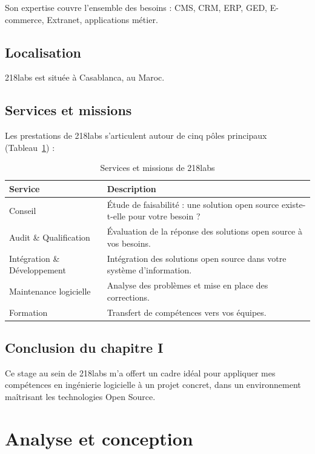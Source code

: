 \documentclass[12pt,a4paper]{report}
\begin{document}
Son expertise couvre l'ensemble des besoins : CMS, CRM, ERP, GED, E-commerce, Extranet, applications métier.

\section{Localisation}

218labs est située à Casablanca, au Maroc.

\section{Services et missions}

Les prestations de 218labs s'articulent autour de cinq pôles principaux (Tableau~\ref{tab:services}) :

\begin{table}[h]
\centering
\begin{tabular}{|l|p{8cm}|}
\hline
\textbf{Service} & \textbf{Description} \\
\hline
Conseil & Étude de faisabilité : une solution open source existe-t-elle pour votre besoin ? \\
\hline
Audit \& Qualification & Évaluation de la réponse des solutions open source à vos besoins. \\
\hline
Intégration \& Développement & Intégration des solutions open source dans votre système d'information. \\
\hline
Maintenance logicielle & Analyse des problèmes et mise en place des corrections. \\
\hline
Formation & Transfert de compétences vers vos équipes. \\
\hline
\end{tabular}
\caption{Services et missions de 218labs}
\label{tab:services}
\end{table}

\section*{Conclusion du chapitre I}

Ce stage au sein de 218labs m'a offert un cadre idéal pour appliquer mes compétences en ingénierie logicielle à un projet concret, dans un environnement maîtrisant les technologies Open Source.

\chapter{Analyse et conception}
\end{document}
